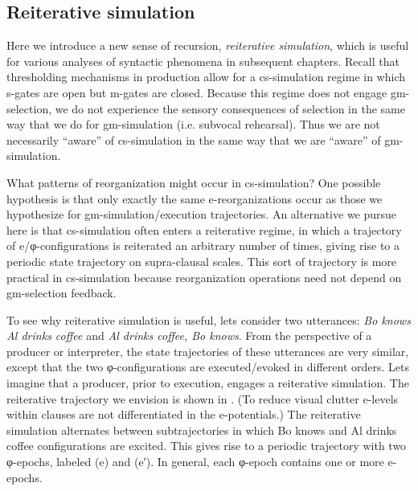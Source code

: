 \subsection{Reiterative simulation}

Here we introduce a new sense of recursion, \textit{reiterative simulation}, which is useful for various analyses of syntactic phenomena in subsequent chapters. Recall that thresholding mechanisms in production allow for a cs-simulation regime in which s-gates are open but m-gates are closed. Because this regime does not engage gm-selection, we do not experience the sensory consequences of selection in the same way that we do for gm-simulation (i.e. subvocal rehearsal). Thus we are not necessarily “aware” of cs-simulation in the same way that we are “aware” of gm-simulation.

  What patterns of reorganization might occur in cs-simulation? One possible hypothesis is that only exactly the same e-reorganizations occur as those we hypothesize for gm-simulation/execution trajectories. An alternative we pursue here is that cs-simulation often enters a reiterative regime, in which a trajectory of e/φ-configurations is reiterated an arbitrary number of times, giving rise to a periodic state trajectory on supra-clausal scales. This sort of trajectory is more practical in cs-simulation because reorganization operations need not depend on gm-selection feedback.

  To see why reiterative simulation is useful, lets consider two utterances: \textit{Bo knows Al drinks coffee} and \textit{Al drinks coffee, Bo knows}. From the perspective of a producer or interpreter, the state trajectories of these utterances are very similar, except that the two φ-configurations are executed/evoked in different orders. Lets imagine that a producer, prior to execution, engages a reiterative simulation. The reiterative trajectory we envision is shown in {}. (To reduce visual clutter e-levels within clauses are not differentiated in the e-potentials.) The reiterative simulation alternates between subtrajectories in which {\textbar}Bo knows{\textbar} and {\textbar}Al drinks coffee{\textbar} configurations are excited. This gives rise to a periodic trajectory with two φ-epochs,  labeled (e) and (e′). In general, each φ-epoch contains one or more e-epochs.

